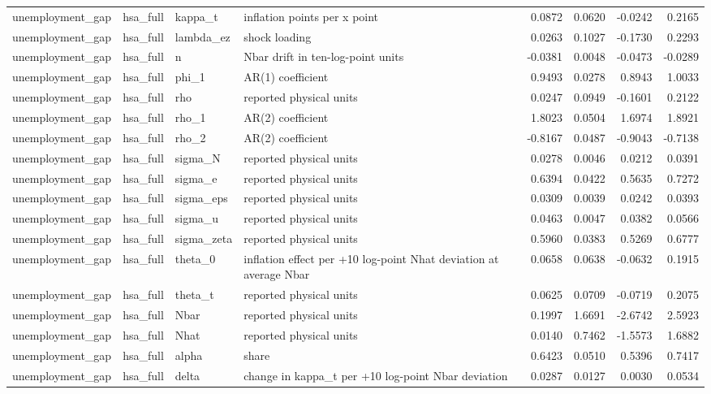 \begin{tabular}{llllrrrr}
unemployment\_gap & hsa\_full & kappa\_t & inflation points per x point & 0.0872 & 0.0620 & -0.0242 & 0.2165 \\
unemployment\_gap & hsa\_full & lambda\_ez & shock loading & 0.0263 & 0.1027 & -0.1730 & 0.2293 \\
unemployment\_gap & hsa\_full & n & Nbar drift in ten-log-point units & -0.0381 & 0.0048 & -0.0473 & -0.0289 \\
unemployment\_gap & hsa\_full & phi\_1 & AR(1) coefficient & 0.9493 & 0.0278 & 0.8943 & 1.0033 \\
unemployment\_gap & hsa\_full & rho & reported physical units & 0.0247 & 0.0949 & -0.1601 & 0.2122 \\
unemployment\_gap & hsa\_full & rho\_1 & AR(2) coefficient & 1.8023 & 0.0504 & 1.6974 & 1.8921 \\
unemployment\_gap & hsa\_full & rho\_2 & AR(2) coefficient & -0.8167 & 0.0487 & -0.9043 & -0.7138 \\
unemployment\_gap & hsa\_full & sigma\_N & reported physical units & 0.0278 & 0.0046 & 0.0212 & 0.0391 \\
unemployment\_gap & hsa\_full & sigma\_e & reported physical units & 0.6394 & 0.0422 & 0.5635 & 0.7272 \\
unemployment\_gap & hsa\_full & sigma\_eps & reported physical units & 0.0309 & 0.0039 & 0.0242 & 0.0393 \\
unemployment\_gap & hsa\_full & sigma\_u & reported physical units & 0.0463 & 0.0047 & 0.0382 & 0.0566 \\
unemployment\_gap & hsa\_full & sigma\_zeta & reported physical units & 0.5960 & 0.0383 & 0.5269 & 0.6777 \\
unemployment\_gap & hsa\_full & theta\_0 & inflation effect per +10 log-point Nhat deviation at average Nbar & 0.0658 & 0.0638 & -0.0632 & 0.1915 \\
unemployment\_gap & hsa\_full & theta\_t & reported physical units & 0.0625 & 0.0709 & -0.0719 & 0.2075 \\
unemployment\_gap & hsa\_full & Nbar & reported physical units & 0.1997 & 1.6691 & -2.6742 & 2.5923 \\
unemployment\_gap & hsa\_full & Nhat & reported physical units & 0.0140 & 0.7462 & -1.5573 & 1.6882 \\
unemployment\_gap & hsa\_full & alpha & share & 0.6423 & 0.0510 & 0.5396 & 0.7417 \\
unemployment\_gap & hsa\_full & delta & change in kappa\_t per +10 log-point Nbar deviation & 0.0287 & 0.0127 & 0.0030 & 0.0534 \\

\end{tabular}
